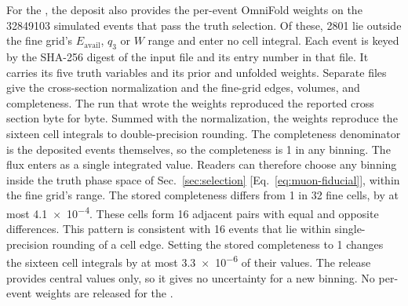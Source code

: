 For the \resSixteen{}, the deposit also provides the per-event OmniFold weights on the \num{32849103} simulated events that pass the truth selection. Of these, \num{2801} lie outside the fine grid's $E_{\mathrm{avail}}$, $q_3$ or $W$ range and enter no cell integral. Each event is keyed by the SHA-256 digest of the input file and its entry number in that file. It carries its five truth variables and its prior and unfolded weights. Separate files give the cross-section normalization and the fine-grid edges, volumes, and completeness. The run that wrote the weights reproduced the reported cross section byte for byte. Summed with the normalization, the weights reproduce the sixteen cell integrals to double-precision rounding. The completeness denominator is the deposited events themselves, so the completeness is 1 in any binning. The flux enters as a single integrated value. Readers can therefore choose any binning inside the truth phase space of Sec.~\ref{sec:selection} [Eq.~\eqref{eq:muon-fiducial}], within the fine grid's range. The stored completeness differs from 1 in 32 fine cells, by at most \num{4.1e-4}. These cells form 16 adjacent pairs with equal and opposite differences. This pattern is consistent with 16 events that lie within single-precision rounding of a cell edge. Setting the stored completeness to 1 changes the sixteen cell integrals by at most \num{3.3e-6} of their values. The release provides central values only, so it gives no uncertainty for a new binning. No per-event weights are released for the \resFiveAxis{}.

